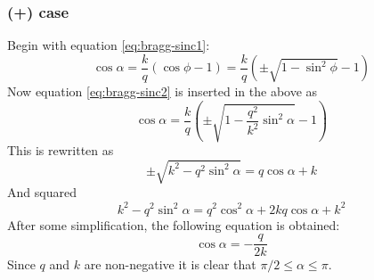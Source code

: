\documentclass[10pt,a4paper]{eitExjobb}
\begin{document}
	\subsubsection{(+) case}
	Begin with equation \ref{eq:bragg-sinc1}:
	\begin{equation*}
	\cos{\alpha} = \frac{k}{q}\left( \cos{\phi} - 1 \right) = \frac{k}{q}\left( \pm \sqrt{1-\sin^2{\phi}} - 1 \right)
	\end{equation*}
	Now equation \ref{eq:bragg-sinc2} is inserted in the above as
	\begin{equation*}
	\cos{\alpha} = \frac{k}{q}\left( \pm \sqrt{1-\frac{q^2}{k^2}\sin^2{\alpha}} - 1 \right)
	\end{equation*}
	This is rewritten as
	\begin{equation*}
	\pm \sqrt{k^2-q^2\sin^2{\alpha}} = q\cos{\alpha} + k
	\end{equation*}
	And squared
	\begin{equation*}
	k^2 - q^2\sin^2{\alpha} = q^2\cos^2{\alpha} + 2kq\cos{\alpha} + k^2
	\end{equation*}
	After some simplification, the following equation is obtained:
	\begin{equation}
	\cos{\alpha} = -\frac{q}{2k} \label{eq:bragg-cos+}
	\end{equation}
	Since $q$ and $k$ are non-negative it is clear that $\pi/2 \leq \alpha \leq \pi$.
	
	
\end{document}
